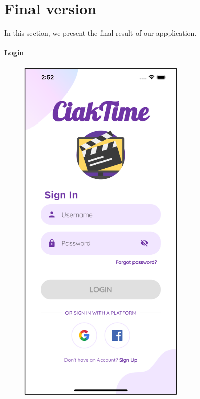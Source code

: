 \documentclass[12pt, a4paper]{article}
\numberwithin{figure}{section}
\begin{document}

\newpage

\section{Final version}

In this section, we present the final result of our appplication.

\paragraph{Login}

\begin{center}
	\begin{minipage}[t]{0.31\textwidth}
		\begin{figure}[H]
			\centering
			\includegraphics[width=0.71\textwidth]{images/prototype2/login.png}\\

\end{figure}
\end{minipage}
\end{center}
\end{document}
